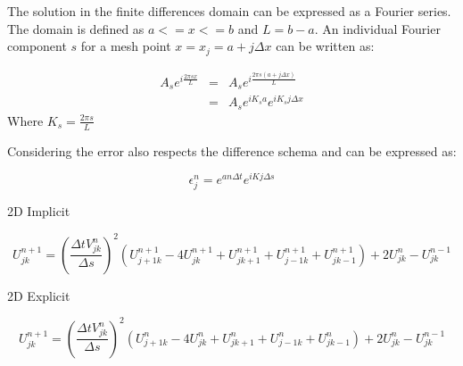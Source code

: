 \documentclass[legalpaper, 12pt]{book}
\begin{document}
The solution in the finite differences domain can be expressed as a Fourier series.
The domain is defined as $  a <= x <= b $ and $ L = b-a $. 
An individual Fourier component $s$ for a mesh point $ x = x_j = a + j\Delta x $ can be written as:

\begin{eqnarray}
A_s e^{i\frac{2\pi s x}{L}} &=& A_s e^{i\frac{2\pi s (a+j\Delta x)}{L}} \nonumber \\
&=& A_s e^{i K_s a} e^{i K_s j \Delta x }
\end{eqnarray}
Where $K_s = \frac{2 \pi s}{L} $


Considering the error also respects the difference schema and can be expressed as:

\[ \epsilon_j^n = e^{an\Delta t} e^{iKj\Delta s} \] 




2D Implicit


\begin{equation}
U_{jk}^{n+1}  =  \left( \frac{\Delta t  V_{jk}^n}{\Delta s} \right) ^2 \left(  U_{j+1k}^{n+1} - 4 U_{jk}^{n+1} + U_{jk+1}^{n+1} + U_{j-1k}^{n+1} + U_{jk-1}^{n+1}  \right) + 2 U_{jk}^{n} - U_{jk}^{n-1}
\end{equation}


2D Explicit

\begin{equation}
U_{jk}^{n+1}  =  \left( \frac{\Delta t  V_{jk}^n}{\Delta s} \right) ^2 \left(  U_{j+1k}^n - 4 U_{jk}^n + U_{jk+1}^n + U_{j-1k}^n + U_{jk-1}^n  \right) + 2 U_{jk}^{n} - U_{jk}^{n-1}
\end{equation}
\end{document}
